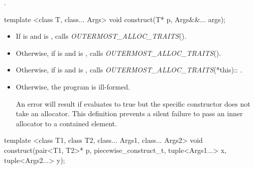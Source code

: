 \begin{itemdescr}
\pnum
\returns {}.
\end{itemdescr}

%
\begin{itemdecl}
template <class T, class... Args>
  void construct(T* p, Args&&... args);
\end{itemdecl}

\begin{itemdescr}
\pnum
\effects

\begin{itemize}
\item If  is  and
 is , calls
\textit{OUTERMOST_ALLOC_TRAITS}().

\item Otherwise, if  is  and
 is , calls
\textit{OUTERMOST_ALLOC_TRAITS}().

\item Otherwise, if  is  and
 is , calls
\textit{OUTERMOST_ALLOC_TRAITS}(*this)::
.

\item Otherwise, the program is ill-formed. \begin{note} An error will result if
 evaluates to true but the specific constructor does not take an
allocator. This definition prevents a silent failure to pass an inner allocator to a
contained element. \end{note}
\end{itemize}
\end{itemdescr}

%
\begin{itemdecl}
template <class T1, class T2, class... Args1, class... Args2>
  void construct(pair<T1, T2>* p, piecewise_construct_t,
                 tuple<Args1...> x, tuple<Args2...> y);
\end{itemdecl}

